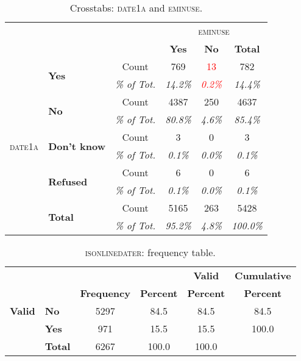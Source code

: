 \begin{table}[h]
\centering{}%
\begin{minipage}[t]{1\columnwidth}%
\begin{center}
\renewcommand{\arraystretch}{1.5}%
\begin{tabular}{clcccc}
\cline{4-6} 
 &  &  & \multicolumn{3}{c}{\textsc{eminuse}}\tabularnewline
\cline{4-6} 
 &  &  & \textbf{Yes} & \textbf{No} & \textbf{Total}\tabularnewline
\hline 
\hline 
\multirow{10}{*}{\textsc{date1a}} & \multirow{2}{*}{\textbf{Yes}} & Count & 769 & \textcolor{red}{13} & 782\tabularnewline
 &  & \textsl{\emph{\% of Tot.}} & \textsl{\emph{14.2\%}} & \textsl{\textcolor{red}{\emph{0.2\%}}} & \textsl{\emph{14.4\%}}\tabularnewline
 & \multirow{2}{*}{\textbf{No}} & Count & 4387 & 250 & 4637\tabularnewline
 &  & \textsl{\emph{\% of Tot.}} & \textsl{\emph{80.8\%}} & \textsl{\emph{4.6\%}} & \textsl{\emph{85.4\%}}\tabularnewline
 & \multirow{2}{*}{\textbf{Don't know}} & Count & 3 & 0 & 3\tabularnewline
 &  & \textsl{\emph{\% of Tot.}} & \textsl{\emph{0.1\%}} & \textsl{\emph{0.0\%}} & \textsl{\emph{0.1\%}}\tabularnewline
 & \multirow{2}{*}{\textbf{Refused}} & Count & 6 & 0 & 6\tabularnewline
 &  & \textsl{\emph{\% of Tot.}} & \textsl{\emph{0.1\%}} & \textsl{\emph{0.0\%}} & \textsl{\emph{0.1\%}}\tabularnewline
 & \multirow{2}{*}{\textbf{Total}} & Count & 5165 & 263 & 5428\tabularnewline
 &  & \textsl{\emph{\% of Tot.}} & \textsl{\emph{95.2\% }} & \textsl{\emph{4.8\% }} & \textsl{\emph{100.0\% }}\tabularnewline
\hline 
\end{tabular}\bigskip{}
\par\end{center}
\begin{center}
\caption{Crosstabs: \textsc{date1a} and \textsc{eminuse}.\label{tab:Crosstabs:-date1a-and}}
\par\end{center}%
\end{minipage}
\end{table}

\begin{table}[h]
\centering{}%
\begin{minipage}[t]{1\columnwidth}%
\begin{center}
\renewcommand{\arraystretch}{1.5}%
\begin{tabular}{clcccc}
\hline 
 &  &  &  & \textbf{Valid} & \textbf{Cumulative}\tabularnewline
 &  & \textbf{Frequency} & \textbf{Percent} & \textbf{Percent} & \textbf{Percent}\tabularnewline
\hline 
\hline 
\textbf{Valid} & \textbf{No} & 5297 & 84.5 & 84.5 & 84.5\tabularnewline
 & \textbf{Yes} & 971 & 15.5 & 15.5 & 100.0\tabularnewline
 & \textbf{Total} & 6267 & 100.0 & 100.0 & \tabularnewline
\hline 
\end{tabular}\bigskip{}
\par\end{center}
\begin{center}
\caption{\textsc{isonlinedater}: frequency table.\label{tab:isonlinedater:-frequency-table.}}
\par\end{center}%
\end{minipage}
\end{table}
\clearpage{}

